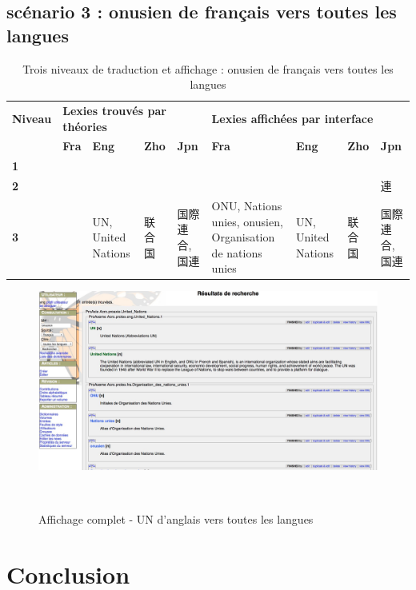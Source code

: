 \documentclass[10pt,a4paper,twoside]{article}
\begin{document}
\begin{itemize}
\subsection{scénario 3 :  onusien de français vers toutes les langues}
\begin{table}[!h]
\centering
	\begin{tabular}{|p{1cm}|p{1.8cm}|p{1cm}|p{1cm}|p{0.5cm}|p{1.8cm}|p{1cm}|p{1cm}|p{1cm}|}
	\hline
	\textbf{Niveau} & \multicolumn{4}{l|}{\textbf{ Lexies trouvés par théories}}&\multicolumn{4}{l|}{\textbf{Lexies affichées par interface}} \\
	\cline{2-9}
	&\textbf{Fra} & \textbf{Eng} & \textbf{Zho} & \textbf{Jpn} & \textbf{Fra} & \textbf{Eng}  & \textbf{Zho} & \textbf{Jpn} \\
	\hline
	\textbf{1} &  &  &  &  &  &  &  &   \\
 	\hline
	\textbf{2} &  &  &  & &  &  &  &連 \\
	\hline
	\textbf{3} &  & \raggedright UN, United Nations & \raggedright 联合国 &\raggedright 国際連合, 国連 & \raggedright ONU, Nations unies, onusien, Organisation de nations unies  & \raggedright UN, United Nations &  \raggedright 联合国 & 国際連合, 国連 \\
	\hline
	\end{tabular}
\caption{Trois niveaux de traduction et affichage : onusien de français vers toutes les langues}\label{table}
\end{table}
\begin{figure}[htbp] 
\begin{center} 
\includegraphics[width=14cm]{images/scenario3.jpg}
\end{center} 
\caption{Affichage complet - UN d'anglais vers toutes les langues} \label{image} \
\end{figure}
\section{Conclusion}


\end{itemize}
\end{document}
